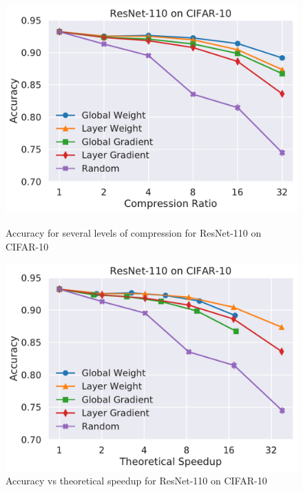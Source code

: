 \begin{figure}
\begin{minipage}[b]{.45\textwidth}
\centering
\includegraphics[width=\linewidth]{shrinkbench/resnet110_CIFAR10_comp}
\caption{Accuracy for several levels of compression for ResNet-110 on CIFAR-10}
\end{minipage}
\hfill
\begin{minipage}[b]{.45\textwidth}
\centering
\includegraphics[width=\linewidth]{shrinkbench/resnet110_CIFAR10_flops}
\caption{Accuracy vs theoretical speedup for ResNet-110 on CIFAR-10}
\end{minipage}
\end{figure}



